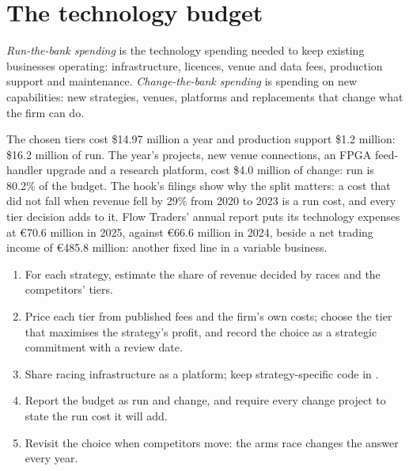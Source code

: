 \section{The technology budget}

\begin{definition}\label{def:fm:technology-strategy:runchange}
\emph{Run-the-bank spending} is the technology spending needed to keep existing businesses operating: infrastructure,
licences, venue and data fees, production support and maintenance. \emph{Change-the-bank spending} is spending on
new capabilities: new strategies, venues, platforms and replacements that change what the firm can do.
\end{definition}

The chosen tiers cost \$14.97 million a year and production support \$1.2 million: \$16.2 million of run. The year's projects, new venue
connections, an FPGA feed-handler upgrade and a research platform, cost \$4.0 million of change: run is 80.2\% of the budget. The hook's filings
show why the split matters: a cost that did not fall when revenue fell by 29\% from 2020 to 2023 is a run cost, and every tier decision adds to
it. Flow Traders' annual report puts its technology expenses at \euro70.6 million in 2025, against \euro66.6 million in 2024, beside a net trading
income of \euro485.8 million: another fixed line in a variable business.

\begin{method}\label{met:fm:technology-strategy:set}
\begin{enumerate}
\item For each strategy, estimate the share of revenue decided by races and the competitors' tiers.
\item Price each tier from published fees and the firm's own costs; choose the tier that maximises the strategy's profit, and record the choice
as a strategic commitment with a review date.
\item Share racing infrastructure as a platform; keep strategy-specific code in .
\item Report the budget as run and change, and require every change project to state the run cost it will add.
\item Revisit the choice when competitors move: the arms race changes the answer every year.
\end{enumerate}
\end{method}

